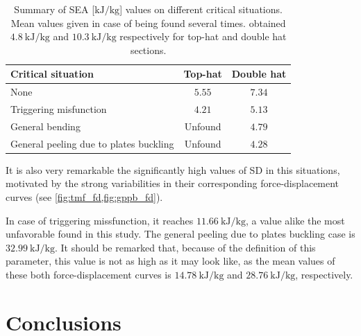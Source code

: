 \documentclass[
documentsize = a4, %
font = cmr, %
typesize = 11, %
printmode = true,
onehalfspacing = true,
language = en, %
titlepage = udciccp, %
degree = pt, %
dedication = true,
acknowledgements = true,
abstract-en = true,
abstract-es = false,
abstract-ga = false,
epigraphs = true,
toc = true,
lof = true,
lot = true,
frontmatterintoc = false,
notation = false,
minimal = false,
]{UDCthesis}
\begin{document}
\begin{table}
	\centering
	\begin{tabular}{lcc}
		\toprule
		Critical situation 						& Top-hat 		& Double hat 	\\
		\midrule
		None 									& $\num{5.55}$	& $\num{7.34}$ 	\\
		Triggering misfunction 					& $\num{4.21}$	& $\num{5.13}$ 	\\
		General bending 						& Unfound		& $\num{4.79}$ 	\\
		General peeling due to plates buckling 	& Unfound		& $\num{4.28}$ 	\\
		\bottomrule
	\end{tabular}
	\caption[Summary of \acrshort{SEA} values on different critical situations.]{Summary of \acrshort{SEA} [$\si{\kJ/\kg}$] values on different critical situations. Mean values given in case of being found several times. \citet{Peroni2009} obtained $\SI{4.8}{\kJ/\kg}$ and $\SI{10.3}{\kJ/\kg}$ respectively for top-hat and double hat sections.}
	\label{tab:critical_sits}
\end{table}

It is also very remarkable the significantly high values of \gls{SD} in this situations, motivated by the strong variabilities in their corresponding force-displacement curves (see \cref{fig:tmf_fd,fig:gppb_fd}).

In case of triggering missfunction, it reaches $\SI{11.66}{\kJ/\kg}$, a value alike the most unfavorable found in this study. The general peeling due to plates buckling case is $\SI{32.99}{\kJ/\kg}$. It should be remarked that, because of the definition of this parameter, this value is not as high as it may look like, as the mean values of these both force-displacement curves is $\SI{14.78}{\kJ/\kg}$ and $\SI{28.76}{\kJ/\kg}$, respectively.

\chapter{Conclusions}
\end{document}
